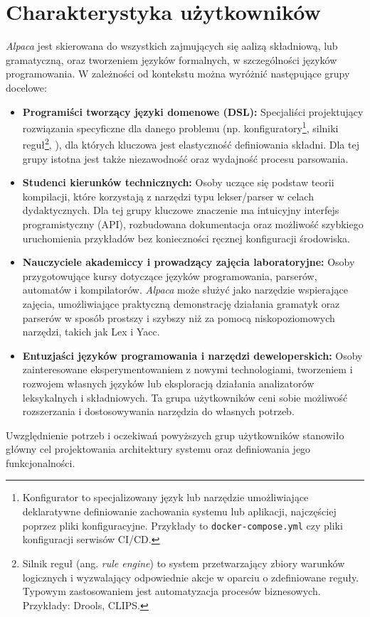 \section{Charakterystyka użytkowników}
\label{sec:charakterystyka-uzytkownikow}

\textit{Alpaca} jest skierowana do wszystkich zajmujących się aalizą składniową, lub gramatyczną, oraz tworzeniem języków formalnych, w szczególności języków programowania.
W zależności od kontekstu można wyróżnić następujące grupy docelowe:

\begin{itemize}
    \item \textbf{Programiści tworzący języki domenowe (DSL):}
    Specjaliści projektujący rozwiązania specyficzne dla danego problemu (np.
    konfiguratory\footnote{Konfigurator to specjalizowany język lub narzędzie umożliwiające deklaratywne definiowanie zachowania systemu lub aplikacji, najczęściej poprzez pliki konfiguracyjne. Przykłady to \texttt{docker-compose.yml} czy pliki konfiguracji serwisów CI/CD.},
    silniki reguł\footnote{Silnik reguł (ang. \textit{rule engine}) to system przetwarzający zbiory warunków logicznych i wyzwalający odpowiednie akcje w oparciu o zdefiniowane reguły. Typowym zastosowaniem jest automatyzacja procesów biznesowych. Przykłady: Drools, CLIPS.},
    ), dla których kluczowa jest elastyczność definiowania składni. Dla tej grupy istotna jest także niezawodność oraz wydajność procesu parsowania.

    \item \textbf{Studenci kierunków technicznych:}
    Osoby uczące się podstaw teorii kompilacji, które korzystają z narzędzi typu lekser/parser w celach dydaktycznych.
    Dla tej grupy kluczowe znaczenie ma intuicyjny interfejs programistyczny (API), rozbudowana dokumentacja oraz możliwość szybkiego uruchomienia przykładów bez konieczności ręcznej konfiguracji środowiska.

    \item \textbf{Nauczyciele akademiccy i prowadzący zajęcia laboratoryjne:}
    Osoby przygotowujące kursy dotyczące języków programowania, parserów, automatów i kompilatorów.
    \textit{Alpaca} może służyć jako narzędzie wspierające zajęcia, umożliwiające praktyczną demonstrację działania gramatyk oraz parserów w sposób prostszy i szybszy niż za pomocą niskopoziomowych narzędzi, takich jak Lex i Yacc.

    \item \textbf{Entuzjaści języków programowania i narzędzi deweloperskich:}
    Osoby zainteresowane eksperymentowaniem z nowymi technologiami, tworzeniem i rozwojem własnych języków lub eksploracją działania analizatorów leksykalnych i składniowych.
    Ta grupa użytkowników ceni sobie możliwość rozszerzania i dostosowywania narzędzia do własnych potrzeb.
\end{itemize}

Uwzględnienie potrzeb i oczekiwań powyższych grup użytkowników stanowiło główny cel projektowania architektury systemu oraz definiowania jego funkcjonalności.
